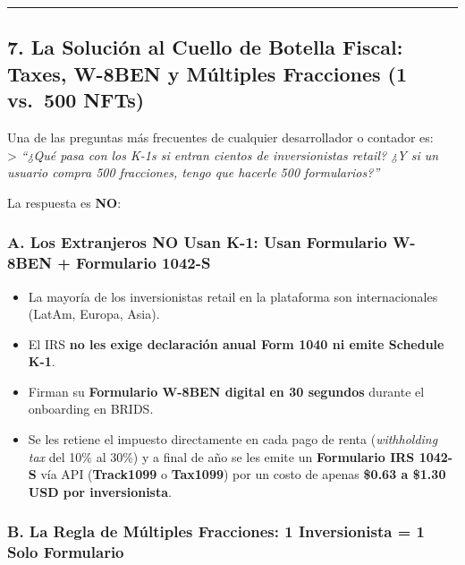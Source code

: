 \documentclass[
]{article}
\providecommand{\tightlist}{%
  \setlength{\itemsep}{0pt}\setlength{\parskip}{0pt}}
\begin{document}
\begin{center}\rule{0.5\linewidth}{0.5pt}\end{center}

\subsection{7. La Solución al Cuello de Botella Fiscal: Taxes, W-8BEN y
Múltiples Fracciones (1 vs.~500
NFTs)}\label{la-soluciuxf3n-al-cuello-de-botella-fiscal-taxes-w-8ben-y-muxfaltiples-fracciones-1-vs.-500-nfts}

Una de las preguntas más frecuentes de cualquier desarrollador o
contador es:\\
\textgreater{} \emph{``¿Qué pasa con los K-1s si entran cientos de
inversionistas retail? ¿Y si un usuario compra 500 fracciones, tengo que
hacerle 500 formularios?''}

La respuesta es \textbf{NO}:

\subsubsection{A. Los Extranjeros NO Usan K-1: Usan Formulario W-8BEN +
Formulario
1042-S}\label{a.-los-extranjeros-no-usan-k-1-usan-formulario-w-8ben-formulario-1042-s}

\begin{itemize}
\tightlist
\item
  La mayoría de los inversionistas retail en la plataforma son
  internacionales (LatAm, Europa, Asia).
\item
  El IRS \textbf{no les exige declaración anual Form 1040 ni emite
  Schedule K-1}.
\item
  Firman su \textbf{Formulario W-8BEN digital en 30 segundos} durante el
  onboarding en BRIDS.
\item
  Se les retiene el impuesto directamente en cada pago de renta
  (\emph{withholding tax} del 10\% al 30\%) y a final de año se les
  emite un \textbf{Formulario IRS 1042-S} vía API (\textbf{Track1099} o
  \textbf{Tax1099}) por un costo de apenas \textbf{\$0.63 a \$1.30 USD
  por inversionista}.
\end{itemize}

\subsubsection{B. La Regla de Múltiples Fracciones: 1 Inversionista = 1
Solo
Formulario}\label{b.-la-regla-de-muxfaltiples-fracciones-1-inversionista-1-solo-formulario}
\end{document}
